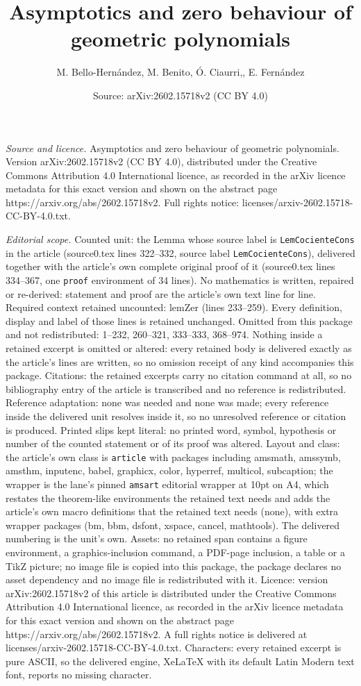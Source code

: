 \documentclass[10pt,a4paper]{amsart}
\title[Asymptotics and zero behaviour of geometric polynomials]{Asymptotics and zero behaviour of geometric polynomials}
\author{M. Bello-Hern\'andez, M. Benito, \'O. Ciaurri,, E. Fern\'andez}
\date{Source: arXiv:2602.15718v2 (CC BY 4.0)}
\begin{document}
\maketitle

\noindent\emph{Source and licence.} Asymptotics and zero behaviour of geometric polynomials. Version arXiv:2602.15718v2 (CC BY 4.0), distributed under the Creative Commons Attribution 4.0 International licence, as recorded in the arXiv licence metadata for this exact version and shown on the abstract page https://arxiv.org/abs/2602.15718v2. Full rights notice: licenses/arxiv-2602.15718-CC-BY-4.0.txt.\par\smallskip

\noindent\textit{Editorial scope.} Counted unit: the Lemma whose source label is \texttt{LemCocienteCons} in the article (source0.tex lines 322--332, source label \texttt{LemCocienteCons}), delivered together with the article's own complete original proof of it (source0.tex lines 334--367, one \texttt{proof} environment of 34 lines). No mathematics is written, repaired or re-derived: statement and proof are the article's own text line for line. Required context retained uncounted: lemZer (lines 233--259). Every definition, display and label of those lines is retained unchanged. Omitted from this package and not redistributed: 1--232, 260--321, 333--333, 368--974. Nothing inside a retained excerpt is omitted or altered: every retained body is delivered exactly as the article's lines are written, so no omission receipt of any kind accompanies this package. Citations: the retained excerpts carry no citation command at all, so no bibliography entry of the article is transcribed and no reference is redistributed. Reference adaptation: none was needed and none was made; every reference inside the delivered unit resolves inside it, so no unresolved reference or citation is produced. Printed slips kept literal: no printed word, symbol, hypothesis or number of the counted statement or of its proof was altered. Layout and class: the article's own class is \texttt{article} with packages including amsmath, amssymb, amsthm, inputenc, babel, graphicx, color, hyperref, multicol, subcaption; the wrapper is the lane's pinned \texttt{amsart} editorial wrapper at 10pt on A4, which restates the theorem-like environments the retained text needs and adds the article's own macro definitions that the retained text needs (none), with extra wrapper packages (bm, bbm, dsfont, xspace, cancel, mathtools). The delivered numbering is the unit's own. Assets: no retained span contains a figure environment, a graphics-inclusion command, a PDF-page inclusion, a table or a TikZ picture; no image file is copied into this package, the package declares no asset dependency and no image file is redistributed with it. Licence: version arXiv:2602.15718v2 of this article is distributed under the Creative Commons Attribution 4.0 International licence, as recorded in the arXiv licence metadata for this exact version and shown on the abstract page https://arxiv.org/abs/2602.15718v2. A full rights notice is delivered at licenses/arxiv-2602.15718-CC-BY-4.0.txt. Characters: every retained excerpt is pure ASCII, so the delivered engine, XeLaTeX with its default Latin Modern text font, reports no missing character.
\end{document}
